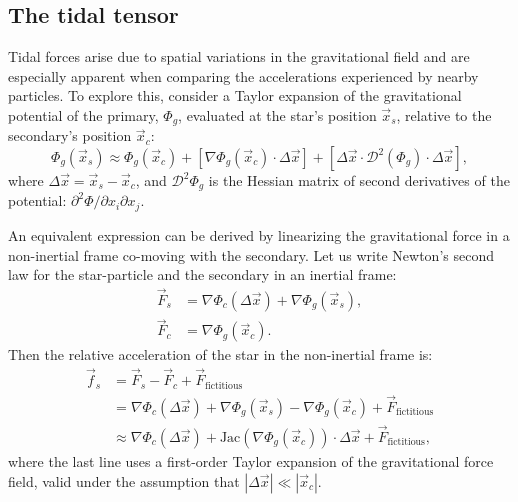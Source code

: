     \subsection{The tidal tensor}
        Tidal forces arise due to spatial variations in the gravitational field and are especially apparent when comparing the accelerations experienced by nearby particles. To explore this, consider a Taylor expansion of the gravitational potential of the primary, \(\Phi_g\), evaluated at the star's position \(\vec{x}_s\), relative to the secondary's position \(\vec{x}_c\):
        \begin{equation}
            \Phi_g\left(\vec{x}_s\right) \approx \Phi_g\left(\vec{x}_c\right) + \left[\nabla \Phi_g (\vec{x}_c)\cdot \Delta \vec{x}\right] + \left[\Delta \vec{x} \cdot \mathcal{D}^2\left(\Phi_g\right) \cdot \Delta\vec{x}\right],
        \end{equation}
        where \(\Delta \vec{x} = \vec{x}_s - \vec{x}_c\), and \(\mathcal{D}^2 \Phi_g\) is the Hessian matrix of second derivatives of the potential: \(\partial^2 \Phi/\partial x_i \partial x_j\).

        An equivalent expression can be derived by linearizing the gravitational force in a non-inertial frame co-moving with the secondary. Let us write Newton's second law for the star-particle and the secondary in an inertial frame:
        \begin{eqnarray}
            \vec{F}_s &= \nabla \Phi_c\left(\Delta \vec{x}\right) + \nabla \Phi_g\left(\vec{x}_s\right),\\
            \vec{F}_c &= \nabla \Phi_g\left(\vec{x}_c\right).
        \end{eqnarray}
        Then the relative acceleration of the star in the non-inertial frame is:
        \begin{eqnarray}
            \vec{f}_s &= \vec{F}_s - \vec{F}_c + \vec{F}_\mathrm{fictitious} \\
                    &= \nabla \Phi_c\left(\Delta \vec{x}\right) + \nabla \Phi_g\left(\vec{x}_s\right) - \nabla \Phi_g\left(\vec{x}_c\right) + \vec{F}_\mathrm{fictitious} \\
                    &\approx \nabla \Phi_c\left(\Delta \vec{x}\right) + \mathrm{Jac}\left(\nabla \Phi_g(\vec{x}_c)\right) \cdot \Delta \vec{x} + \vec{F}_\mathrm{fictitious},
        \end{eqnarray}
        where the last line uses a first-order Taylor expansion of the gravitational force field, valid under the assumption that \(|\Delta \vec{x}| \ll |\vec{x}_c|\). 

